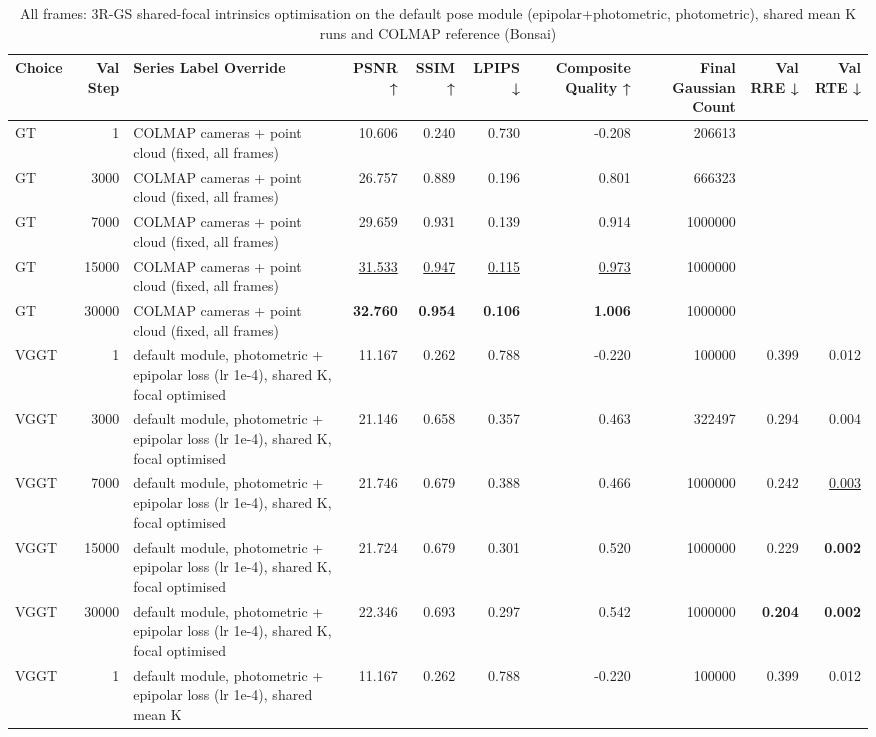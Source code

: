 \begin{table}[H]
\caption{\ifdefined\customcaption \customcaption \else All frames: 3R-GS shared-focal intrinsics optimisation on the default pose module (epipolar+photometric, photometric), shared mean K runs and COLMAP reference (Bonsai) \fi}
\label{tab:122_omega_epi_intropt_default_bonsai}
\centering
\tiny
\begin{tabular}{lrlrrrrrrr}
\toprule
Choice & Val Step & Series Label Override & PSNR ↑ & SSIM ↑ & LPIPS ↓ & Composite Quality ↑ & Final Gaussian Count & Val RRE ↓ & Val RTE ↓ \\
\midrule
GT & 1 & COLMAP cameras + point cloud (fixed, all frames) & 10.606 & 0.240 & 0.730 & -0.208 & 206613 &  &  \\
GT & 3000 & COLMAP cameras + point cloud (fixed, all frames) & 26.757 & 0.889 & 0.196 & 0.801 & 666323 &  &  \\
GT & 7000 & COLMAP cameras + point cloud (fixed, all frames) & 29.659 & 0.931 & 0.139 & 0.914 & 1000000 &  &  \\
GT & 15000 & COLMAP cameras + point cloud (fixed, all frames) & \underline{31.533} & \underline{0.947} & \underline{0.115} & \underline{0.973} & 1000000 &  &  \\
GT & 30000 & COLMAP cameras + point cloud (fixed, all frames) & \textbf{32.760} & \textbf{0.954} & \textbf{0.106} & \textbf{1.006} & 1000000 &  &  \\
VGGT & 1 & default module, photometric + epipolar loss (lr 1e-4), shared K, focal optimised & 11.167 & 0.262 & 0.788 & -0.220 & 100000 & 0.399 & 0.012 \\
VGGT & 3000 & default module, photometric + epipolar loss (lr 1e-4), shared K, focal optimised & 21.146 & 0.658 & 0.357 & 0.463 & 322497 & 0.294 & 0.004 \\
VGGT & 7000 & default module, photometric + epipolar loss (lr 1e-4), shared K, focal optimised & 21.746 & 0.679 & 0.388 & 0.466 & 1000000 & 0.242 & \underline{0.003} \\
VGGT & 15000 & default module, photometric + epipolar loss (lr 1e-4), shared K, focal optimised & 21.724 & 0.679 & 0.301 & 0.520 & 1000000 & 0.229 & \textbf{0.002} \\
VGGT & 30000 & default module, photometric + epipolar loss (lr 1e-4), shared K, focal optimised & 22.346 & 0.693 & 0.297 & 0.542 & 1000000 & \textbf{0.204} & \textbf{0.002} \\
VGGT & 1 & default module, photometric + epipolar loss (lr 1e-4), shared mean K & 11.167 & 0.262 & 0.788 & -0.220 & 100000 & 0.399 & 0.012 \\

\end{tabular}
\end{table}
